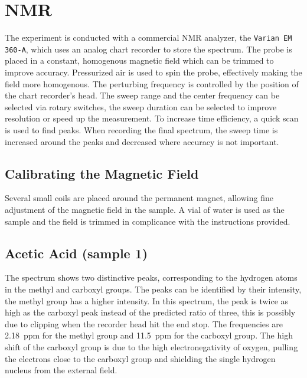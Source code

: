 \chapter{NMR}
The experiment is conducted with a commercial NMR analyzer, the \texttt{Varian EM 360-A}, which uses an analog chart recorder to store the spectrum.
The probe is placed in a constant, homogenous magnetic field which can be trimmed to improve accuracy.
Pressurized air is used to spin the probe, effectively making the field more homogenous. %
The perturbing frequency is controlled by the position of the chart recorder's head.
The sweep range and the center frequency can be selected via rotary switches, the sweep duration can be selected to improve resolution or speed up the measurement.
To increase time efficiency, a quick scan is used to find peaks.
When recording the final spectrum, the sweep time is increased around the peaks and decreased where accuracy is not important.

\section{Calibrating the Magnetic Field}
Several small coils are placed around the permanent magnet, allowing fine adjustment of the magnetic field in the sample.
A vial of water is used as the sample and the field is trimmed in complicance with the instructions provided.


\section{Acetic Acid (sample 1)}
The spectrum shows two distinctive peaks, corresponding to the hydrogen atoms in the methyl and carboxyl groups.
The peaks can be identified by their intensity, the methyl group has a higher intensity.
In this spectrum, the peak is twice as high as the carboxyl peak instead of the predicted ratio of three, this is possibly due to clipping when the recorder head hit the end stop.
The frequencies are \SI{2.18}{ppm} for the methyl group and \SI{11.5}{ppm} for the carboxyl group.
The high shift of the carboxyl group is due to the high electronegativity of oxygen, pulling the electrons close to the carboxyl group and shielding the single hydrogen nucleus from the external field.

